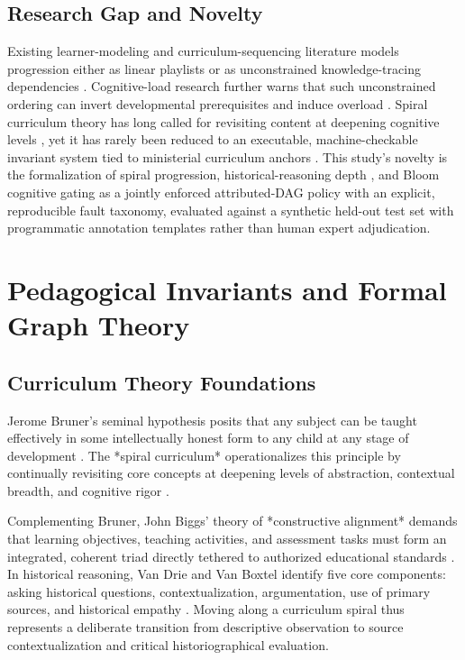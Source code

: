\documentclass[11pt,a4paper]{article}
\begin{document}
\subsection{Research Gap and Novelty}

Existing learner-modeling and curriculum-sequencing literature models progression either as linear playlists or as unconstrained knowledge-tracing dependencies \cite{corbett1994knowledge, pelanek2017bayesian}. Cognitive-load research further warns that such unconstrained ordering can invert developmental prerequisites and induce overload \cite{sweller2011cognitive}. Spiral curriculum theory has long called for revisiting content at deepening cognitive levels \cite{bruner1960process, harden2000spiral}, yet it has rarely been reduced to an executable, machine-checkable invariant system tied to ministerial curriculum anchors \cite{biggs2011teaching, moet2018general}. This study's novelty is the formalization of spiral progression, historical-reasoning depth \cite{vandrie2008historical}, and Bloom cognitive gating \cite{krathwohl2002revision} as a jointly enforced attributed-DAG policy with an explicit, reproducible fault taxonomy, evaluated against a synthetic held-out test set with programmatic annotation templates rather than human expert adjudication.

\section{Pedagogical Invariants and Formal Graph Theory}

\subsection{Curriculum Theory Foundations}

Jerome Bruner's seminal hypothesis posits that any subject can be taught effectively in some intellectually honest form to any child at any stage of development \cite{bruner1960process}. The *spiral curriculum* operationalizes this principle by continually revisiting core concepts at deepening levels of abstraction, contextual breadth, and cognitive rigor \cite{harden2000spiral}. 

Complementing Bruner, John Biggs' theory of *constructive alignment* demands that learning objectives, teaching activities, and assessment tasks must form an integrated, coherent triad directly tethered to authorized educational standards \cite{biggs2011teaching}. In historical reasoning, Van Drie and Van Boxtel identify five core components: asking historical questions, contextualization, argumentation, use of primary sources, and historical empathy \cite{vandrie2008historical}. Moving along a curriculum spiral thus represents a deliberate transition from descriptive observation to source contextualization and critical historiographical evaluation.
\end{document}
